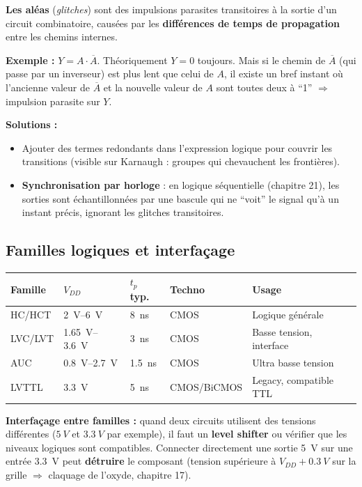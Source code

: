\documentclass[12pt,a4paper,twoside]{book}
\begin{document}
\begin{attention}
\textbf{Les aléas} (\textit{glitches}) sont des impulsions parasites transitoires à la sortie d'un circuit combinatoire, causées par les \textbf{différences de temps de propagation} entre les chemins internes.

\textbf{Exemple :} $Y = A \cdot \overline{A}$. Théoriquement $Y = 0$ toujours. Mais si le chemin de $\overline{A}$ (qui passe par un inverseur) est plus lent que celui de $A$, il existe un bref instant où l'ancienne valeur de $\overline{A}$ et la nouvelle valeur de $A$ sont toutes deux à ``1'' $\Rightarrow$ impulsion parasite sur $Y$.

\textbf{Solutions :}
\begin{itemize}[nosep]
\item Ajouter des termes redondants dans l'expression logique pour couvrir les transitions (visible sur Karnaugh : groupes qui chevauchent les frontières).
\item \textbf{Synchronisation par horloge} : en logique séquentielle (chapitre 21), les sorties sont échantillonnées par une bascule qui ne ``voit'' le signal qu'à un instant précis, ignorant les glitches transitoires.
\end{itemize}
\end{attention}

\subsection{Familles logiques et interfaçage}

\begin{pratique}
\begin{center}
\renewcommand{\arraystretch}{1.3}
\begin{tabular}{p{2.5cm}p{2cm}p{2cm}p{2cm}p{3.5cm}}
\toprule
\textbf{Famille} & \textbf{$V_{DD}$} & \textbf{$t_p$ typ.} & \textbf{Techno} & \textbf{Usage} \\
\midrule
HC/HCT & \SI{2}{V}--\SI{6}{V} & \SI{8}{ns} & CMOS & Logique générale \\
LVC/LVT & \SI{1.65}{V}--\SI{3.6}{V} & \SI{3}{ns} & CMOS & Basse tension, interface \\
AUC & \SI{0.8}{V}--\SI{2.7}{V} & \SI{1.5}{ns} & CMOS & Ultra basse tension \\
LVTTL & \SI{3.3}{V} & \SI{5}{ns} & CMOS/BiCMOS & Legacy, compatible TTL \\
\bottomrule
\end{tabular}
\end{center}

\textbf{Interfaçage entre familles :} quand deux circuits utilisent des tensions différentes ($\SI{5}{V}$ et $\SI{3.3}{V}$ par exemple), il faut un \textbf{level shifter} ou vérifier que les niveaux logiques sont compatibles. Connecter directement une sortie \SI{5}{V} sur une entrée \SI{3.3}{V} peut \textbf{détruire} le composant (tension supérieure à $V_{DD} + \SI{0.3}{V}$ sur la grille $\Rightarrow$ claquage de l'oxyde, chapitre 17).
\end{pratique}
\end{document}
